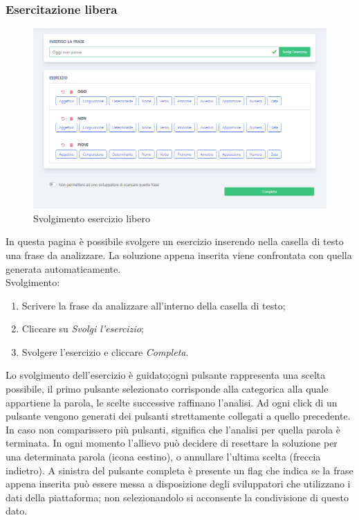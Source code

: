 		 \subsubsection{Esercitazione libera}      
        	\begin{figure}[H]
                \centering
                \includegraphics[width=17cm]{sez/img/studente/esercitazioneLiberaEsegui.PNG} 
                \caption{Svolgimento esercizio libero}\label{fig:1}
        	\end{figure}
          In questa pagina è possibile svolgere un esercizio inserendo nella casella di testo una frase da analizzare. La soluzione appena inserita viene confrontata con quella generata automaticamente.
        \\ Svolgimento:
        	\begin{enumerate}        
            	\item Scrivere la frase da analizzare all'interno della casella di testo;
            	\item Cliccare su \textit{Svolgi l'esercizio};
            	\item Svolgere l'esercizio e cliccare \textit{Completa}.
        	\end{enumerate}
        	\label{sec:esLib}
        	Lo svolgimento dell'esercizio è guidato;ogni pulsante rappresenta una scelta possibile, il primo pulsante selezionato corrisponde alla categorica alla quale appartiene la parola, le scelte successive raffinano l'analisi. Ad ogni click di un pulsante vengono generati dei pulsanti strettamente collegati a quello precedente. In caso non comparissero più pulsanti, significa che l'analisi per quella parola è terminata. In ogni momento l'allievo può decidere di resettare la soluzione per una determinata parola (icona cestino), o annullare l'ultima scelta (freccia indietro).        \linebreak	
        A sinistra del pulsante completa è presente un flag che indica se la frase appena inserita può essere messa a disposizione degli sviluppatori che utilizzano i dati della piattaforma; non selezionandolo si acconsente la condivisione di questo dato.
        	

